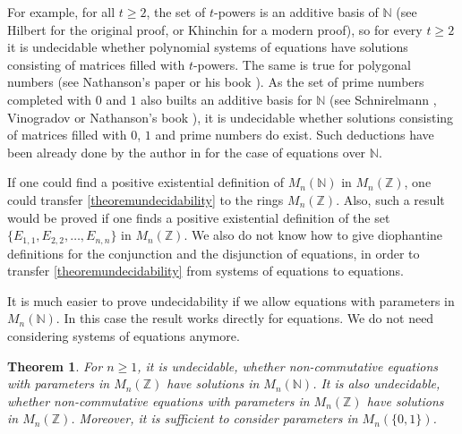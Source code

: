 \documentclass{article}
\theoremstyle{plain}
\newtheorem{theorem}{Theorem}[section]
\theoremstyle{definition}
\begin{document}
For example, for all $t \geq 2$, the set of $t$-powers is an additive basis of $\mathbb N$ (see Hilbert \cite{Hilbert} for the original proof, or Khinchin \cite{Khinchin} for a modern proof), so for every $t \geq 2$ it is undecidable whether polynomial systems of equations have solutions consisting of matrices filled with $t$-powers. The same is true for polygonal numbers (see Nathanson's paper \cite{Nathanson} or his book \cite{Nathanson1}). As the set of prime numbers completed with $0$ and $1$ also builts an additive basis for $\mathbb N$ (see Schnirelmann \cite{Schnirelmann}, Vinogradov \cite{Vinogradov} or Nathanson's book \cite{Nathanson1}), it is undecidable whether solutions consisting of matrices filled with $0$, $1$ and prime numbers do exist. Such deductions have been already done by the author in \cite{Prunescu} for the case of equations over $\mathbb N$.

If one could find a positive existential definition of $M_n(\mathbb N)$ in $M_n(\mathbb Z)$, one could transfer \cref{theoremundecidability} to the rings $M_n(\mathbb Z)$. Also, such a result would be proved if one finds a positive existential definition of the set $\{E_{1,1}, E_{2,2}, \dots, E_{n,n}\}$ in $M_n(\mathbb Z)$. We also do not know how to give diophantine definitions for the conjunction and the disjunction of equations, in order to transfer \cref{theoremundecidability} from systems of equations to equations. 

It is much easier to prove undecidability if we allow equations with parameters in $M_n(\mathbb N)$. In this case the result works directly for equations. We do not need considering systems of equations anymore. 

\begin{theorem}
For $n \geq 1$, it is undecidable, whether non-commutative equations with parameters in $M_n(\mathbb Z)$ have solutions in $M_n(\mathbb N)$. It is also undecidable, whether  non-commutative equations with parameters in $M_n(\mathbb Z)$ have solutions in $M_n(\mathbb Z)$.  Moreover, it is sufficient to consider parameters in $M_n(\{0,1\})$. 
\end{theorem} 
\end{document}
